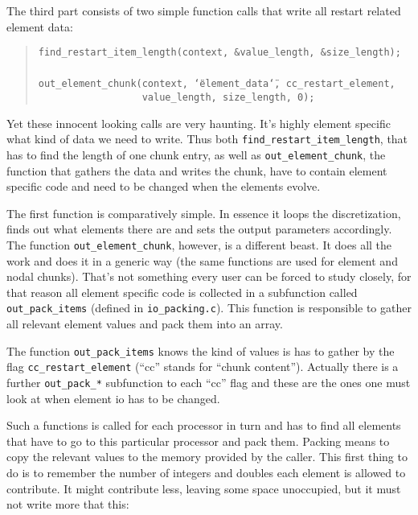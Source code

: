 The third part consists of two simple function calls that write all
restart related element data: 

\begin{quote}
\texttt{find{\_}restart{\_}item{\_}length(context,~{\&}value{\_}length,~{\&}size{\_}length);~}~\\
 \texttt{out{\_}element{\_}chunk(context,~\char`\"{}element{\_}data\char`\"{},~cc{\_}restart{\_}element,~}~\\
 \texttt{~~~~~~~~~~~~~~~~~~value{\_}length,~size{\_}length,~0); }
\end{quote}
Yet these innocent looking calls are very haunting. It's highly element
specific what kind of data we need to write. Thus both \texttt{find{\_}restart{\_}item{\_}length},
that has to find the length of one chunk entry, as well as \texttt{out{\_}element{\_}chunk},
the function that gathers the data and writes the chunk, have to contain
element specific code and need to be changed when the elements evolve.

The first function is comparatively simple. In essence it loops the
discretization, finds out what elements there are and sets the output
parameters accordingly. The function \texttt{out{\_}element{\_}chunk},
however, is a different beast. It does all the work and does it in
a generic way (the same functions are used for element and nodal chunks).
That's not something every user can be forced to study closely, for
that reason all element specific code is collected in a subfunction
called \texttt{out{\_}pack{\_}items} (defined in \texttt{io{\_}packing.c}).
This function is responsible to gather all relevant element values
and pack them into an array.

The function \texttt{out{\_}pack{\_}items} knows the kind of values
is has to gather by the flag \texttt{cc{\_}restart{\_}element}
({}``cc'' stands for {}``chunk content''). Actually there is a
further \texttt{out{\_}pack{\_}{*}} subfunction to each {}``cc''
flag and these are the ones one must look at when element io has to
be changed.

Such a functions is called for each processor in turn and has to find
all elements that have to go to this particular processor and pack
them. Packing means to copy the relevant values to the memory provided
by the caller. This first thing to do is to remember the number of
integers and doubles each element is allowed to contribute. It might
contribute less, leaving some space unoccupied, but it must not write
more that this: 


